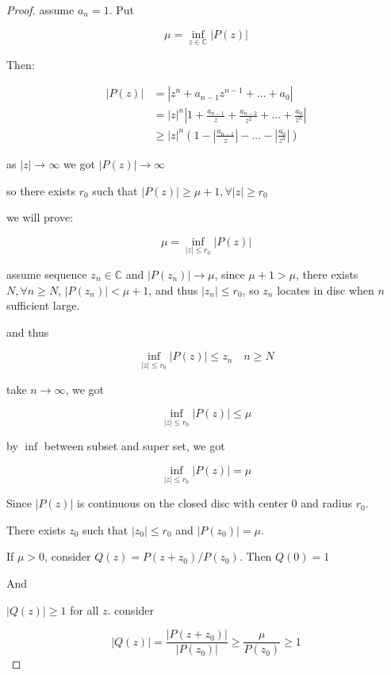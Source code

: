 \begin{proof}
    assume $a_n = 1$. Put

    \[
        \mu = \inf_{z \in \mathbb{C}} \left| P(z)\right|
    \]

    Then:

    \begin{align}
        \left| P(z)\right| &= \left|z^n + a_{n-1}z^{n-1} + ... + a_0 \right| \\
        &= \left| z\right|^n \left| 1 + \frac{a_{n-1}}{z} + \frac{a_{n-2}}{z^2} + ... + \frac{a_0}{z^n}\right| \\
        & \ge\left| z\right|^n \left(1- \left|\frac{a_{n-1}}{z} \right| - ... - \left|\frac{a_{0}}{z^n} \right|\right)
    \end{align}

    as $\left| z \right| \to \infty$ we got $\left| P(z)\right| \to \infty$

    so there exists $r_0$ such that $|P(z)| \ge \mu + 1, \forall |z| \ge r_0$


    we will prove:

    \[
        \mu = \inf_{|z| \le r_0} \left| P(z)\right| 
    \]

    assume sequence $z_n \in \mathbb{C}$ and $|P(z_n)| \to \mu$, since $\mu + 1 > \mu$, there exists $N, \forall n \ge N$,
    $|P(z_n)| < \mu + 1$, and thus $|z_n| \le r_0$, so $z_n$ locates in disc when $n$ sufficient large.

    and thus

    \[
        \inf_{|z| \le r_0} \left| P(z)\right| \le z_n \quad n \ge N
    \]

    take $n \to \infty$, we got

    \[
        \inf_{|z| \le r_0} \left| P(z)\right| \le \mu
    \]

    by $\inf$ between subset and super set, we got

    \[
        \inf_{|z| \le r_0} \left| P(z)\right| = \mu
    \]

    Since $|P(z)|$ is continuous on the closed disc with center $0$ and radius $r_0$.



    There exists $z_0$ such that $| z_0 | \le r_0$ and $|P(z_0)| = \mu$.

    If $\mu > 0$, consider $Q(z) = P(z+z_0) / P(z_0)$. Then $Q(0)= 1$ 
    
    And

    $|Q(z)| \ge 1 $ for all $z$. consider

    \[
        |Q(z)| = \frac{|P(z+z_0)|}{|P(z_0)|} \ge \frac{\mu}{P(z_0)} \ge 1
    \]


\end{proof}
